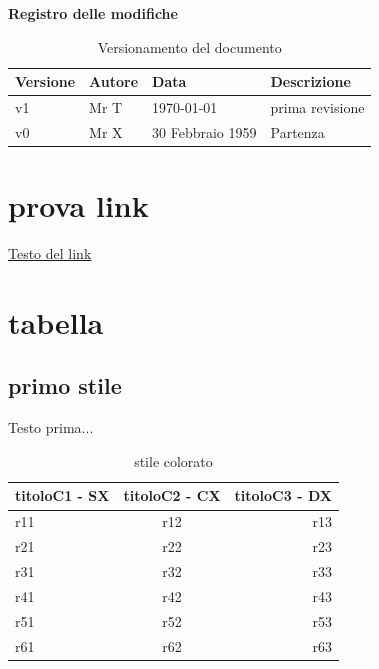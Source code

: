 \documentclass[12pt,a4paper]{article}
\begin{document}
\Large{\textbf{Registro delle modifiche}}\\
\normalsize

\begin{table}[h]
\begin{center}

\begin{tabular}{p{} p{} p{} p{}}
\toprule
\textbf{Versione}	&	\textbf{Autore}	&	\textbf{Data}	&	\textbf{Descrizione}\\
\midrule
\midrule
v1	&	Mr T	&	\today 	&	prima revisione\\
\midrule
v0	&	Mr X	&	30 Febbraio 1959	&	Partenza\\
\bottomrule
\end{tabular}
\caption{Versionamento del documento}
\label{tabVers1}
\end{center}
\end{table}
\newpage

\tableofcontents
\newpage

\listoftables
\listoffigures
\newpage


\section{prova link}
\href{http://docs.oracle.com/javase/tutorial/}{Testo del link}
\newpage

\section{tabella}
\subsection{primo stile}
Testo prima...
\begin{table}[h]
\begin{center}
\begin{tabular}{lcr}
\toprule
titoloC1 - SX	&	titoloC2 - CX	&	titoloC3 - DX\\
\midrule
\midrule
r11	& r12 & r13\\
r21	& r22 & r23\\
r31 & r32 & r33\\
r41 & r42 & r43\\
r51 & r52 & r53\\
\midrule
r61 & r62 & r63\\
\bottomrule
\end{tabular}
\end{center}

\caption{stile colorato}
\label{t1}
\end{table}
\end{document}
